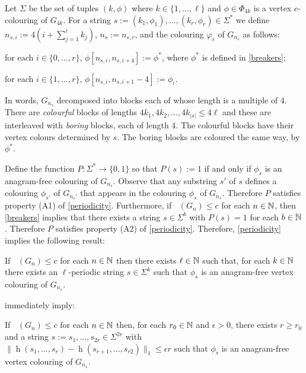 \documentclass{patmorin}
\DeclareMathOperator{\afcn}{\dot{\chi}_\pi}
\DeclareMathOperator{\hist}{h}
\begin{document}
Let $\Sigma$ be the set of tuples $(k,\phi)$ where $k\in\{1,\ldots,\ell\}$ and $\phi\in\Phi_{4k}$ is a vertex $c$-colouring of $G_{4k}$.  For a string $s:=(k_1,\phi_1),\ldots,(k_r,\phi_r)\in\Sigma^*$ we define $n_{s,i}:=4(i+\sum_{j=1}^i k_j)$, $n_s:=n_{s,r}$, and the colouring $\varphi_s$ of $G_{n_s}$ as follows:
\begin{compactenum}
    \item for each $i\in\{0,\ldots,r\}$, $\phi[n_{s,i},n_{s,i+4}]:=\phi^*$, where $\phi^*$ is defined in \cref{breakers};
    \item for each $i\in\{1,\ldots,r\}$, $\phi[n_{s,i},n_{s,i+1}-4]:=\phi_i$.
\end{compactenum}
In words, $G_{n_s}$ decomposed into blocks each of whose length is a multiple of $4$.  There are \emph{colourful} blocks of lengths $4k_1,4k_2,\ldots,4k_{|s|}\le 4\ell$ and these are interleaved with \emph{boring} blocks, each of length $4$.  The colourful blocks have their vertex colours determined by $s$. The boring blocks are coloured the same way, by $\phi^*$.

Define the function $P:\Sigma^*\to\{0,1\}$ so that $P(s):=1$ if and only if $\phi_s$ is an anagram-free colouring of $G_{n_s}$.  Observe that any substring $s'$ of $s$ defines a colouring $\phi_{s'}$ of $G_{n_s'}$ that appears in the colouring $\phi_s$ of $G_{n_s}$. Therefore $P$ satisfies property (A1) of \cref{periodicity}.  Furthermore, if $\afcn(G_n)\le c$ for each $n\in\mathbb{N}$, then \cref{breakers} implies that there exists a string $s\in\Sigma^{b}$ with $P(s)=1$ for each $b\in\mathbb{N}$.  Therefore $P$ satisfies property (A2) of \cref{periodicity}.  Therefore, \cref{periodicity} implies the following result:

\begin{lem}\label{block_colouring}
    If $\afcn(G_n)\le c$ for each $n\in\mathbb{N}$ then there exists $\ell\in\mathbb{N}$ such that, for each $k\in\mathbb{N}$ there exists an $\ell$-periodic string $s\in\Sigma^{k}$ such that $\phi_s$ is an anagram-free vertex colouring of $G_{n_s}$.
\end{lem}

 immediately imply:

\begin{lem}\label{near_anagram_graph}
    If $\afcn(G_n)\le c$ for each $n\in\mathbb{N}$ then, for each $r_0\in\mathbb{N}$ and $\epsilon>0$, there exists $r\ge r_0$ and a string $s:=s_1,\ldots,s_{2r}\in\Sigma^{2r}$ with $\|\hist(s_1,\ldots,s_r)-\hist(s_{r+1},\ldots,s_{r2})\|_1\le\epsilon r$ such that $\phi_s$ is an anagram-free vertex colouring of $G_{n_s}$.
\end{lem}
\end{document}
